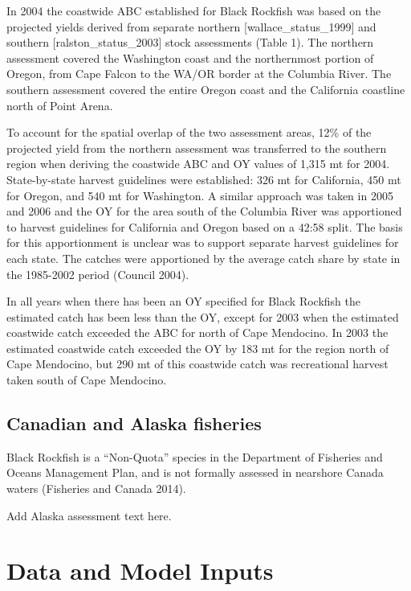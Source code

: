 \documentclass[11pt,
  english,
  letterpaper,
]{article}
\begin{document}
In 2004 the coastwide ABC established for Black Rockfish was based on the projected yields derived from separate northern {[}wallace\_status\_1999{]} and southern {[}ralston\_status\_2003{]} stock assessments (Table 1). The northern assessment covered the Washington coast and the northernmost portion of Oregon, from Cape Falcon to the WA/OR border at the Columbia River. The southern assessment covered the entire Oregon coast and the California coastline north of Point Arena.

To account for the spatial overlap of the two assessment areas, 12\% of the projected yield from the northern assessment was transferred to the southern region when deriving the coastwide ABC and OY values of 1,315 mt for 2004. State-by-state harvest guidelines were established: 326 mt for California, 450 mt for Oregon, and 540 mt for Washington. A similar approach was taken in 2005 and 2006 and the OY for the area south of the Columbia River was apportioned to harvest guidelines for California and Oregon based on a 42:58 split. The basis for this apportionment is unclear was to support separate harvest guidelines for each state. The catches were apportioned by the average catch share by state in the 1985-2002 period (Council 2004).

In all years when there has been an OY specified for Black Rockfish the estimated catch has been less than the OY, except for 2003 when the estimated coastwide catch exceeded the ABC for north of Cape Mendocino. In 2003 the estimated coastwide catch exceeded the OY by 183 mt for the region north of Cape Mendocino, but 290 mt of this coastwide catch was recreational harvest taken south of Cape Mendocino.

\hypertarget{canadian-and-alaska-fisheries}{%
\subsection{Canadian and Alaska fisheries}\label{canadian-and-alaska-fisheries}}

Black Rockfish is a ``Non-Quota'' species in the Department of Fisheries and Oceans Management Plan, and is not formally assessed in nearshore Canada waters (Fisheries and Canada 2014).

Add Alaska assessment text here.

\hypertarget{data-and-model-inputs}{%
\section{Data and Model Inputs}\label{data-and-model-inputs}}
\end{document}
